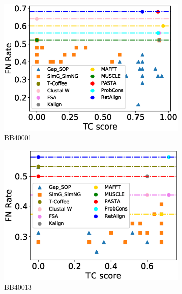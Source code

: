 \begin{figure}[!htbp]
	\centering
	\begin{adjustwidth}{-1.5cm}{-1cm}
		\begin{subfigure}{0.22\textwidth}
			\includegraphics[width=\columnwidth]{Figure/summary/precomputedInit/Balibase/BB40001_fnrate_vs_tc_2}
			\caption{BB40001}
		\end{subfigure}	
		\begin{subfigure}{0.22\textwidth}
			\includegraphics[width=\columnwidth]{Figure/summary/precomputedInit/Balibase/BB40013_fnrate_vs_tc_2}
			\caption{BB40013}
		\end{subfigure}
		\begin{subfigure}{0.22\textwidth}

\end{subfigure}
\end{adjustwidth}
\end{figure}
